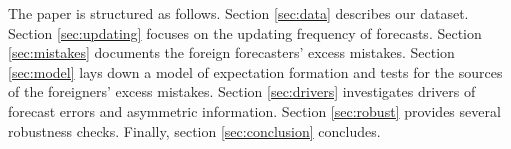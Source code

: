 The paper is structured as follows. Section \ref{sec:data} describes our dataset. Section \ref{sec:updating} focuses on the updating frequency of forecasts. Section \ref{sec:mistakes} documents the foreign forecasters' excess mistakes. Section \ref{sec:model} lays down a model of expectation formation and tests for the sources of the foreigners' excess mistakes. Section \ref{sec:drivers} investigates drivers of forecast errors and asymmetric information. Section \ref{sec:robust} provides several robustness checks. Finally, section  \ref{sec:conclusion} concludes. 